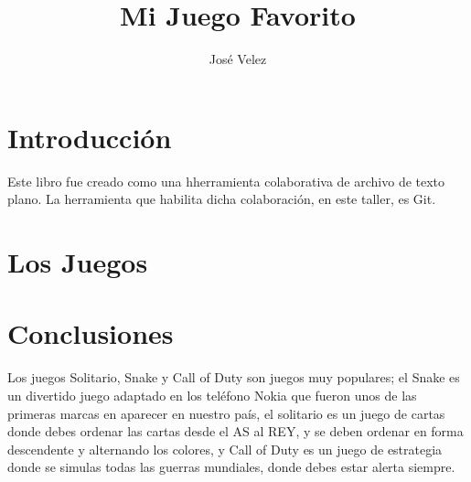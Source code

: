 \documentclass[12pt,oneside]{book}
\title{Mi Juego Favorito}
\author{José Velez}
\begin{document}
\maketitle
\tableofcontents

\chapter{Introducción}
Este libro fue creado como una hherramienta colaborativa de archivo de texto plano. La herramienta que habilita dicha colaboración, en este taller, es Git.

\chapter{Los Juegos}

%

%

\chapter{Conclusiones}
Los juegos Solitario, Snake y Call of Duty son juegos muy populares; el Snake es un divertido juego adaptado en los teléfono Nokia que fueron unos de las primeras marcas en aparecer en nuestro país, el solitario es un juego de cartas donde debes ordenar las cartas desde el AS al REY, y se deben ordenar en forma descendente y alternando los colores, y Call of Duty es un juego de estrategia donde se simulas todas las guerras mundiales, donde debes estar alerta siempre.
\end{document}
